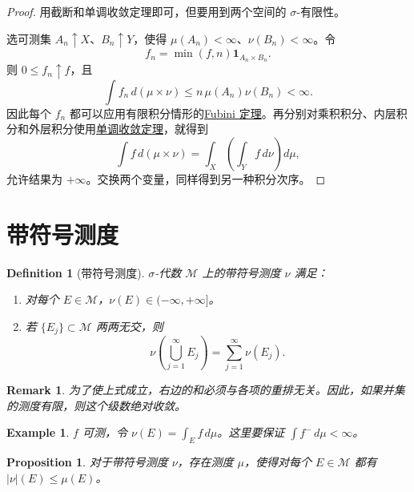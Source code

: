 \documentclass[12pt,letterpaper,twoside,openright]{ctexbook}
\theoremstyle{bluehead}
\newtheorem{proposition}[theorem]{Proposition}
\theoremstyle{olivehead}
\newtheorem{definition}{Definition}
\theoremstyle{orangehead}
\newtheorem{example}[theorem]{Example}
\theoremstyle{redremark}
\newtheorem*{remark}{Remark}
\begin{document}
\begin{proof}
用截断和单调收敛定理即可，但要用到两个空间的 $\sigma$-有限性。

选可测集 $A_n\uparrow X$、$B_n\uparrow Y$，使得 $\mu(A_n)<\infty$、$\nu(B_n)<\infty$。令
\[
f_n=\min(f,n)\mathbf1_{A_n\times B_n}.
\]
则 $0\leq f_n\uparrow f$，且
\[
\int f_n\,d(\mu\times\nu)\leq n\,\mu(A_n)\nu(B_n)<\infty.
\]
因此每个 $f_n$ 都可以应用有限积分情形的\hyperref[thm:fubini-general]{Fubini 定理}。再分别对乘积积分、内层积分和外层积分使用\hyperref[thm:monotone-convergence]{单调收敛定理}，就得到
\[
\int f\,d(\mu\times\nu)
=\int_X\left(\int_Y f\,d\nu\right)d\mu,
\]
允许结果为 $+\infty$。交换两个变量，同样得到另一种积分次序。
\end{proof}
\section{带符号测度}

\begin{definition}[带符号测度]
$\sigma$-代数 $\mathcal M$ 上的带符号测度 $\nu$ 满足：
\begin{enumerate}
\item[(1)] 对每个 $E\in\mathcal M$，$\nu(E)\in(-\infty,+\infty]$。
\item[(2)] 若 $\{E_j\}\subset\mathcal M$ 两两无交，则
\[
\nu\!\left(\bigcup_{j=1}^{\infty}E_j\right)=\sum_{j=1}^{\infty}\nu(E_j).
\]
\end{enumerate}
\end{definition}

\begin{remark}
为了使上式成立，右边的和必须与各项的重排无关。因此，如果并集的测度有限，则这个级数绝对收敛。
\end{remark}

\begin{example}
$f$ 可测，令 $\nu(E)=\int_E f\,d\mu$。这里要保证 $\int f^-\,d\mu<\infty$。
\end{example}

\begin{proposition}
对于带符号测度 $\nu$，存在测度 $\mu$，使得对每个 $E\in\mathcal M$ 都有 $|\nu|(E)\leq\mu(E)$。
\end{proposition}
\end{document}

